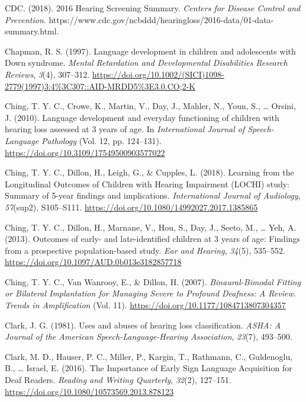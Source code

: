 \documentclass[
  english,
  man]{apa6}
\begin{document}
\leavevmode\hypertarget{ref-cdc2018}{}%
CDC. (2018). 2016 Hearing Screening Summary. \emph{Centers for Disease Control and Prevention}. https://www.cdc.gov/ncbddd/hearingloss/2016-data/01-data-summary.html.

\leavevmode\hypertarget{ref-chapman1997}{}%
Chapman, R. S. (1997). Language development in children and adolescents with Down syndrome. \emph{Mental Retardation and Developmental Disabilities Research Reviews}, \emph{3}(4), 307--312. \url{https://doi.org/10.1002/(SICI)1098-2779(1997)3:4\%3C307::AID-MRDD5\%3E3.0.CO;2-K}

\leavevmode\hypertarget{ref-ching2010}{}%
Ching, T. Y. C., Crowe, K., Martin, V., Day, J., Mahler, N., Youn, S., \ldots{} Orsini, J. (2010). Language development and everyday functioning of children with hearing loss assessed at 3 years of age. In \emph{International Journal of Speech-Language Pathology} (Vol. 12, pp. 124--131). \url{https://doi.org/10.3109/17549500903577022}

\leavevmode\hypertarget{ref-ching2018}{}%
Ching, T. Y. C., Dillon, H., Leigh, G., \& Cupples, L. (2018). Learning from the Longitudinal Outcomes of Children with Hearing Impairment (LOCHI) study: Summary of 5-year findings and implications. \emph{International Journal of Audiology}, \emph{57}(sup2), S105--S111. \url{https://doi.org/10.1080/14992027.2017.1385865}

\leavevmode\hypertarget{ref-ching2013}{}%
Ching, T. Y. C., Dillon, H., Marnane, V., Hou, S., Day, J., Seeto, M., \ldots{} Yeh, A. (2013). Outcomes of early- and late-identified children at 3 years of age: Findings from a prospective population-based study. \emph{Ear and Hearing}, \emph{34}(5), 535--552. \url{https://doi.org/10.1097/AUD.0b013e3182857718}

\leavevmode\hypertarget{ref-ching2007}{}%
Ching, T. Y. C., Van Wanrooy, E., \& Dillon, H. (2007). \emph{Binaural-Bimodal Fitting or Bilateral Implantation for Managing Severe to Profound Deafness: A Review}. \emph{Trends in Amplification} (Vol. 11). \url{https://doi.org/10.1177/1084713807304357}

\leavevmode\hypertarget{ref-clark1981}{}%
Clark, J. G. (1981). Uses and abuses of hearing loss classification. \emph{ASHA: A Journal of the American Speech-Language-Hearing Association}, \emph{23}(7), 493--500.

\leavevmode\hypertarget{ref-clark2016}{}%
Clark, M. D., Hauser, P. C., Miller, P., Kargin, T., Rathmann, C., Guldenoglu, B., \ldots{} Israel, E. (2016). The Importance of Early Sign Language Acquisition for Deaf Readers. \emph{Reading and Writing Quarterly}, \emph{32}(2), 127--151. \url{https://doi.org/10.1080/10573569.2013.878123}
\end{document}
